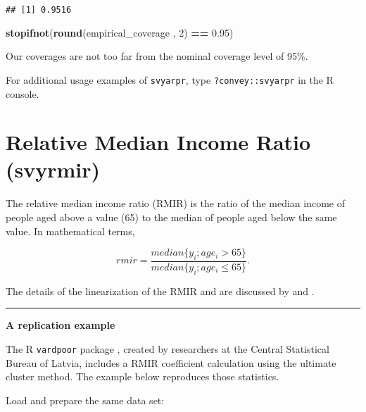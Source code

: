 \documentclass[
]{book}
\newenvironment{Shaded}{\begin{snugshade}}{\end{snugshade}}
\newcommand{\DecValTok}[1]{\textcolor[rgb]{0.00,0.00,0.81}{#1}}
\newcommand{\FloatTok}[1]{\textcolor[rgb]{0.00,0.00,0.81}{#1}}
\newcommand{\FunctionTok}[1]{\textcolor[rgb]{0.13,0.29,0.53}{\textbf{#1}}}
\newcommand{\NormalTok}[1]{#1}
\newcommand{\SpecialCharTok}[1]{\textcolor[rgb]{0.81,0.36,0.00}{\textbf{#1}}}
\begin{document}
\begin{verbatim}
## [1] 0.9516
\end{verbatim}

\begin{Shaded}
\begin{Highlighting}[]
\FunctionTok{stopifnot}\NormalTok{(}\FunctionTok{round}\NormalTok{(empirical\_coverage , }\DecValTok{2}\NormalTok{) }\SpecialCharTok{==} \FloatTok{0.95}\NormalTok{)}
\end{Highlighting}
\end{Shaded}

Our coverages are not too far from the nominal coverage level of 95\%.

For additional usage examples of \texttt{svyarpr}, type \texttt{?convey::svyarpr} in the R console.

\hypertarget{relative-median-income-ratio-svyrmir}{%
\section{Relative Median Income Ratio (svyrmir)}\label{relative-median-income-ratio-svyrmir}}

The relative median income ratio (RMIR) is the ratio of the median income of people aged above a value (65) to the median of people aged below the same value. In mathematical terms,

\[
rmir = \frac{median\{y_i; age_i >65 \}}{median\{y_i; age_i \leq 65 \}}.
\]

The details of the linearization of the RMIR and are discussed by \textcite{deville1999} and \textcite{osier2009}.

\begin{center}\rule{0.5\linewidth}{0.5pt}\end{center}

\textbf{A replication example}

The R \texttt{vardpoor} package \autocite{vardpoor}, created by researchers at the Central Statistical Bureau of Latvia, includes a RMIR coefficient calculation using the ultimate cluster method. The example below reproduces those statistics.

Load and prepare the same data set:
\end{document}
